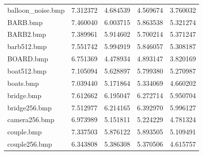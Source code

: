 \documentclass{article}
\begin{document}
\begin{table}[H]
\begin{tabular}{lrrrr}
    balloon\_noise.bmp & 7.312372                     & 4.684539                               & 4.569674                                  & 3.760032                                   \\
    BARB.bmp           & 7.460040                     & 6.003715                               & 5.863538                                  & 5.321274                                   \\
    BARB2.bmp          & 7.389961                     & 5.914602                               & 5.700214                                  & 5.371247                                   \\
    barb512.bmp        & 7.551742                     & 5.994919                               & 5.846057                                  & 5.308187                                   \\
    BOARD.bmp          & 6.751369                     & 4.478934                               & 4.893147                                  & 3.820169                                   \\
    boat512.bmp        & 7.105094                     & 5.628897                               & 5.799380                                  & 5.270987                                   \\
    boats.bmp          & 7.039440                     & 5.171864                               & 5.334069                                  & 4.660202                                   \\
    bridge.bmp         & 7.612662                     & 6.195047                               & 6.272714                                  & 5.950704                                   \\
    bridge256.bmp      & 7.512977                     & 6.214165                               & 6.392970                                  & 5.996127                                   \\
    camera256.bmp      & 6.973989                     & 5.151811                               & 5.224229                                  & 4.781324                                   \\
    couple.bmp         & 7.337503                     & 5.876122                               & 5.893505                                  & 5.109491                                   \\
    couple256.bmp      & 6.343808                     & 5.386308                               & 5.370506                                  & 4.615757                                   \\

\end{tabular}
\end{table}
\end{document}
